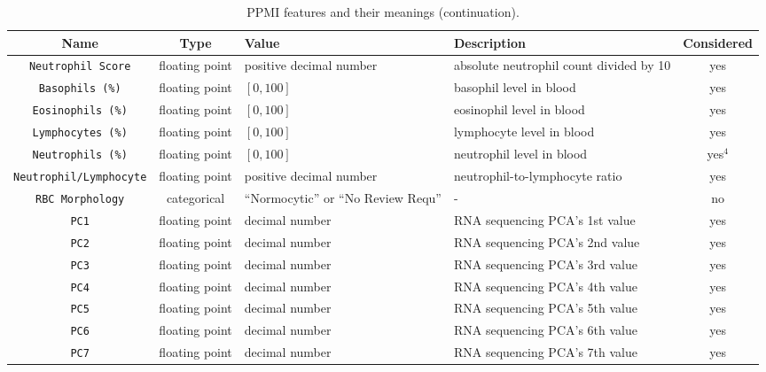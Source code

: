 \clearpage
\begin{table}[!ht]
    \centering 
    \begin{threeparttable}
    \caption{PPMI features and their meanings (continuation).}
    \begin{tabular}{c | c p{3cm} p{4cm} c}
        \toprule
        Name & Type & Value & Description & Considered \\ 
        \midrule
        \texttt{Neutrophil Score} 
            & floating point & positive decimal number & absolute neutrophil count divided by 10 & yes \\ 
        \texttt{Basophils (\%)} 
            & floating point & $[0, 100]$ & basophil level in blood & yes \\ 
        \texttt{Eosinophils (\%)} 
            & floating point & $[0, 100]$ & eosinophil level in blood & yes \\ 
        \texttt{Lymphocytes (\%)} 
            & floating point & $[0, 100]$ & lymphocyte level in blood & yes \\ 
        \texttt{Neutrophils (\%)} 
            & floating point & $[0, 100]$ & neutrophil level in blood & yes$^4$ \\ 
        \texttt{Neutrophil/Lymphocyte} 
            & floating point & positive decimal number & neutrophil-to-lymphocyte ratio & yes \\ 
        \texttt{RBC Morphology} 
            & categorical & ``Normocytic'' or ``No Review Requ'' & - & no \\ 
        \texttt{PC1} 
            & floating point & decimal number & RNA sequencing PCA's 1st value & yes \\
        \texttt{PC2} 
            & floating point & decimal number & RNA sequencing PCA's 2nd value & yes \\
        \texttt{PC3} 
            & floating point & decimal number & RNA sequencing PCA's 3rd value & yes \\
        \texttt{PC4} 
            & floating point & decimal number & RNA sequencing PCA's 4th value & yes \\
        \texttt{PC5} 
            & floating point & decimal number & RNA sequencing PCA's 5th value & yes \\
        \texttt{PC6} 
            & floating point & decimal number & RNA sequencing PCA's 6th value & yes \\
        \texttt{PC7} 
            & floating point & decimal number & RNA sequencing PCA's 7th value & yes \\

\end{tabular}
\end{threeparttable}
\end{table}
